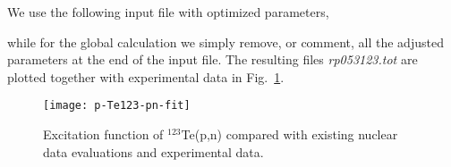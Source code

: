 \begin{samplecase}
We use the following input file with optimized parameters,


while for the global calculation we simply remove, or comment, all the adjusted parameters at the end of the input file.
The resulting files {\em rp053123.tot} are plotted
together with experimental data in Fig.~\ref{p-Te123-pn-fit}.

\end{samplecase}
\begin{figure}
\centering\texttt{[image: p-Te123-pn-fit]}
\caption{Excitation function of ${}^{123}$Te(p,n) compared with existing nuclear data evaluations and
experimental data.}
\label{p-Te123-pn-fit}
\end{figure}
